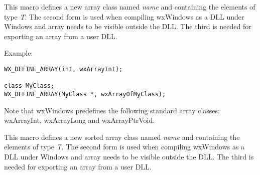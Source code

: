 \\
\\
\\
\\


\\


\label{wxdefinearray}




This macro defines a new array class named {\it name} and containing the
elements of type {\it T}. The second form is used when compiling wxWindows as
a DLL under Windows and array needs to be visible outside the DLL.  The third is
needed for exporting an array from a user DLL.

Example:

\begin{verbatim}
WX_DEFINE_ARRAY(int, wxArrayInt);

class MyClass;
WX_DEFINE_ARRAY(MyClass *, wxArrayOfMyClass);
\end{verbatim}

Note that wxWindows predefines the following standard array classes: wxArrayInt,
wxArrayLong and wxArrayPtrVoid.

\label{wxdefinesortedarray}




This macro defines a new sorted array class named {\it name} and containing
the elements of type {\it T}. The second form is used when compiling wxWindows as
a DLL under Windows and array needs to be visible outside the DLL.  The third is
needed for exporting an array from a user DLL.

